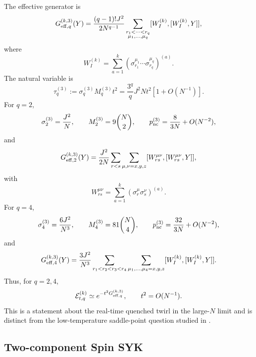 \documentclass{article}
\theoremstyle{definition}
\begin{document}
The effective generator is
\begin{equation}
    G_{{\rm eff},q}^{(k,3)}(Y)
    =\frac{(q-1)!J^2}{2N^{q-1}}
    \sum_{\substack{r_1<\cdots<r_q\\
                    \mu_1,\ldots,\mu_q}}
    [W_I^{(k)},[W_I^{(k)},Y]],
\end{equation}
where
\begin{equation}
    W_I^{(k)}
    =\sum_{a=1}^k
    \left(
       \sigma_{r_1}^{\mu_1}\cdots\sigma_{r_q}^{\mu_q}
    \right)^{(a)}.
\end{equation}
The natural variable is
\begin{equation}
    \tau_q^{(3)}
    :=\sigma_q^{(3)}M_q^{(3)}t^2
    =\frac{3^q}{q}J^2Nt^2[1+O(N^{-1})].
\end{equation}
For $q=2$,
\begin{equation}
    \sigma_2^{(3)}=\frac{J^2}{N},
    \qquad
    M_2^{(3)}=9\binom N2,
    \qquad
    p_{\rm nc}^{(3)}=\frac{8}{3N}+O(N^{-2}),
\end{equation}
and
\begin{equation}
    G_{{\rm eff},2}^{(k,3)}(Y)
    =\frac{J^2}{2N}
    \sum_{r<s}\sum_{\mu,\nu=x,y,z}
    [W_{rs}^{\mu\nu},[W_{rs}^{\mu\nu},Y]],
\end{equation}
with
\begin{equation}
    W_{rs}^{\mu\nu}
    =\sum_{a=1}^k(\sigma_r^\mu\sigma_s^\nu)^{(a)}.
\end{equation}
For $q=4$,
\begin{equation}
    \sigma_4^{(3)}=\frac{6J^2}{N^3},
    \qquad
    M_4^{(3)}=81\binom N4,
    \qquad
    p_{\rm nc}^{(3)}=\frac{32}{3N}+O(N^{-2}),
\end{equation}
and
\begin{equation}
    G_{{\rm eff},4}^{(k,3)}(Y)
    =\frac{3J^2}{N^3}
    \sum_{r_1<r_2<r_3<r_4}
    \sum_{\mu_1,\ldots,\mu_4=x,y,z}
    [W_I^{(k)},[W_I^{(k)},Y]].
\end{equation}
Thus, for $q=2,4$,
\begin{equation}
    {\cal E}_{t,q}^{(k)}
    \simeq e^{-t^2G_{{\rm eff},q}^{(k,3)}},
    \qquad t^2=O(N^{-1}).
\end{equation}
This is a statement about the real-time quenched twirl in the 
large-$N$ limit and is distinct from the low-temperature saddle-point
question studied in \cite{swingle2024bosonic}.

\subsection{Two-component Spin SYK}
\end{document}
